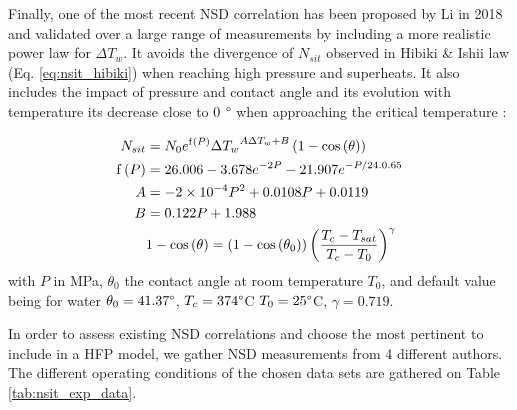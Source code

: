 \npar

Finally, one of the most recent NSD correlation has been proposed by Li \etal in 2018 \cite{li_new_2018} and validated over a large range of measurements by including a more realistic power law for $\Delta T_{w}$. It avoids the divergence of $N_{sit}$ observed in Hibiki \& Ishii law (Eq. \ref{eq:nsit_hibiki}) when reaching high pressure and superheats. It also includes the impact of pressure and contact angle and its evolution with temperature \eg its decrease close to 0 $\degree$ when approaching the critical temperature \cite{song_fan_contact_angle}:


\begin{align}
N_{sit} &= N_{0}e^{\mathrm{f}\parth{P}} {\Delta T_{w}}^{A\Delta T_{w} + B} \parth{1- \cos{\theta}}
\label{eq:nsit_li}\\
%
\mathrm{f}\parth{P} &= 26.006 - 3.678 e^{-2P} - 21.907e^{-P / 24.0.65}\\
%
A &= -2\times 10^{-4} P^{2} + 0.0108P + 0.0119\\
%
B &= 0.122P +1.988\\
%
&1-\cos{\theta} = \parth{1-\cos{\theta_{0}}}\parth{\frac{T_{c}-T_{sat}}{T_{c}-T_{0}}}^{\gamma}
\end{align}
with $P$ in MPa, $\theta_{0}$ the contact angle at room temperature $T_{0}$, and default value being for water $\theta_{0}=41.37 \degree$, $T_{c}=374 \degree$C $T_{0}=25\degree$C, $\gamma = 0.719$.

\npar

In order to assess existing NSD correlations and choose the most pertinent to include in a HFP model, we gather NSD measurements from 4 different authors. The different operating conditions of the chosen data sets are gathered on Table \ref{tab:nsit_exp_data}.



